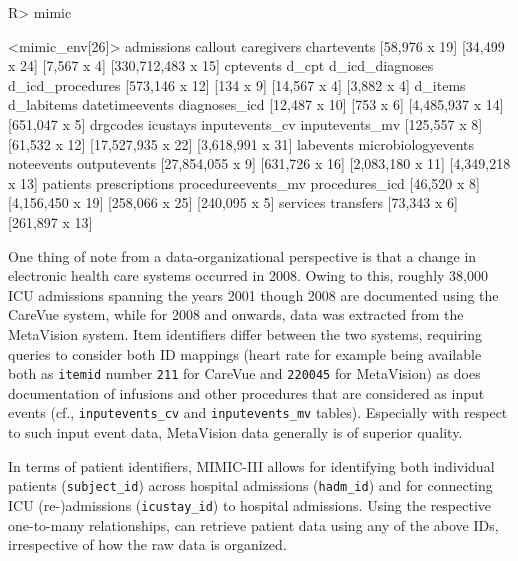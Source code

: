 \documentclass[
  notitle]{jss}
\begin{document}
\begin{CodeChunk}
\begin{CodeInput}
R> mimic
\end{CodeInput}
\begin{CodeOutput}
<mimic_env[26]>
        admissions            callout         caregivers        chartevents 
     [58,976 x 19]      [34,499 x 24]        [7,567 x 4] [330,712,483 x 15] 
         cptevents              d_cpt    d_icd_diagnoses   d_icd_procedures 
    [573,146 x 12]          [134 x 9]       [14,567 x 4]        [3,882 x 4] 
           d_items         d_labitems     datetimeevents      diagnoses_icd 
     [12,487 x 10]          [753 x 6]   [4,485,937 x 14]      [651,047 x 5] 
          drgcodes           icustays     inputevents_cv     inputevents_mv 
     [125,557 x 8]      [61,532 x 12]  [17,527,935 x 22]   [3,618,991 x 31] 
         labevents microbiologyevents         noteevents       outputevents 
  [27,854,055 x 9]     [631,726 x 16]   [2,083,180 x 11]   [4,349,218 x 13] 
          patients      prescriptions procedureevents_mv     procedures_icd 
      [46,520 x 8]   [4,156,450 x 19]     [258,066 x 25]      [240,095 x 5] 
          services          transfers 
      [73,343 x 6]     [261,897 x 13] 
\end{CodeOutput}
\end{CodeChunk}

One thing of note from a data-organizational perspective is that a
change in electronic health care systems occurred in 2008. Owing to
this, roughly 38,000 ICU admissions spanning the years 2001 though 2008
are documented using the CareVue system, while for 2008 and onwards,
data was extracted from the MetaVision system. Item identifiers differ
between the two systems, requiring queries to consider both ID mappings
(heart rate for example being available both as \texttt{itemid} number
\texttt{211} for CareVue and \texttt{220045} for MetaVision) as does
documentation of infusions and other procedures that are considered as
input events (cf., \texttt{inputevents\_cv} and \texttt{inputevents\_mv}
tables). Especially with respect to such input event data, MetaVision
data generally is of superior quality.

In terms of patient identifiers, MIMIC-III allows for identifying both
individual patients (\texttt{subject\_id}) across hospital admissions
(\texttt{hadm\_id}) and for connecting ICU (re-)admissions
(\texttt{icustay\_id}) to hospital admissions. Using the respective
one-to-many relationships,  can retrieve patient data using
any of the above IDs, irrespective of how the raw data is organized.
\end{document}
